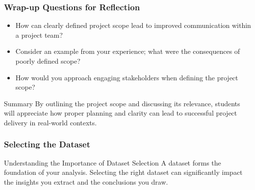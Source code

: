 \documentclass[aspectratio=169]{beamer}
\begin{document}
\begin{frame}[fragile]
    \frametitle{Wrap-up Questions for Reflection}
    \begin{itemize}
        \item How can clearly defined project scope lead to improved communication within a project team?
        \item Consider an example from your experience; what were the consequences of poorly defined scope?
        \item How would you approach engaging stakeholders when defining the project scope?
    \end{itemize}
    
    \begin{block}{Summary}
        By outlining the project scope and discussing its relevance, students will appreciate how proper planning and clarity can lead to successful project delivery in real-world contexts.
    \end{block}
\end{frame}

\begin{frame}[fragile]
    \frametitle{Selecting the Dataset}
    \begin{block}{Understanding the Importance of Dataset Selection}
        A dataset forms the foundation of your analysis. Selecting the right dataset can significantly impact the insights you extract and the conclusions you draw. 
    \end{block}
\end{frame}
\end{document}
